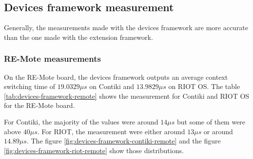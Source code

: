 

\subsection{Devices framework measurement}

Generally, the measurements made with the devices framework are more accurate than the one made with the extension framework.

\subsubsection{RE-Mote measurements}
On the RE-Mote board, the devices framework outputs an average context switching time of $19.0329\mu s$ on Contiki and $13.9829 \mu s$ on RIOT OS.
The table \ref{tab:devices-framework-remote} shows the measurement for Contiki and RIOT OS for the RE-Mote board.



For Contiki, the majority of the values were around $14\mu s$ but some of them were above $40\mu s$.
For RIOT, the measurement were either around $13 \mu s$ or around $14.89 \mu s$.
The figure \ref{fig:devices-framework-contiki-remote} and the figure \ref{fig:devices-framework-riot-remote} show those distributions.

